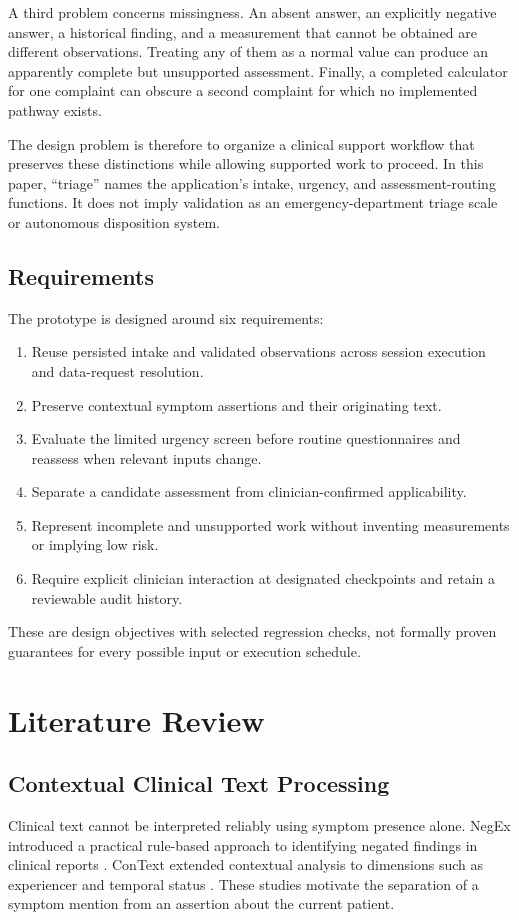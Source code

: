 \documentclass[conference]{IEEEtran}
\begin{document}
A third problem concerns missingness. An absent answer, an explicitly negative answer, a historical finding, and a measurement that cannot be obtained are different observations. Treating any of them as a normal value can produce an apparently complete but unsupported assessment. Finally, a completed calculator for one complaint can obscure a second complaint for which no implemented pathway exists.

The design problem is therefore to organize a clinical support workflow that preserves these distinctions while allowing supported work to proceed. In this paper, ``triage'' names the application's intake, urgency, and assessment-routing functions. It does not imply validation as an emergency-department triage scale or autonomous disposition system.

\subsection{Requirements}
The prototype is designed around six requirements:
\begin{enumerate}
\item Reuse persisted intake and validated observations across session execution and data-request resolution.
\item Preserve contextual symptom assertions and their originating text.
\item Evaluate the limited urgency screen before routine questionnaires and reassess when relevant inputs change.
\item Separate a candidate assessment from clinician-confirmed applicability.
\item Represent incomplete and unsupported work without inventing measurements or implying low risk.
\item Require explicit clinician interaction at designated checkpoints and retain a reviewable audit history.
\end{enumerate}
These are design objectives with selected regression checks, not formally proven guarantees for every possible input or execution schedule.

\section{Literature Review}
\subsection{Contextual Clinical Text Processing}
Clinical text cannot be interpreted reliably using symptom presence alone. NegEx introduced a practical rule-based approach to identifying negated findings in clinical reports \cite{negex}. ConText extended contextual analysis to dimensions such as experiencer and temporal status \cite{context}. These studies motivate the separation of a symptom mention from an assertion about the current patient.
\end{document}
